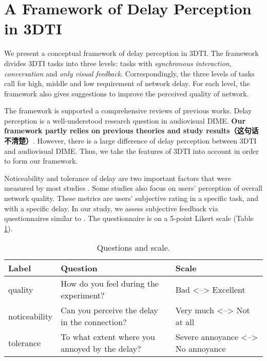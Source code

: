 \section{A Framework of Delay Perception in 3DTI}


We present a conceptual framework of delay perception in 3DTI. The framework divides 3DTI tasks into three levels: tasks with \emph{synchronous interaction}, \emph{conversation} and \emph{only visual feedback}. Correspondingly, the three levels of tasks call for high, middle and low requirement of network delay. For each level, the framework also gives suggestions to improve the perceived quality of network.

The framework is supported a comprehensive reviews of previous works. Delay perception is a well-understood research question in audiovisual DIME. \textbf{Our framework partly relies on previous theories and study results（这句话不清楚）}. However, there is a large difference of delay perception between 3DTI and audiovisual DIME. Thus, we take the features of 3DTI into account in order to form our framework.

Noticeability and tolerance of delay are two important factors that were measured by most studies \cite{wu2009quality, schmitt2014influence, geerts2011we, schmitt2014asymmetric}. Some studies also focus on users' perception of overall network quality. These metrics are users' subjective rating in a specific task, and with a specific delay. In our study, we assess subjective feedback via questionnaires similar to \cite{schmitt2014influence}. The questionnaire is on a 5-point Likert scale (Table \ref{tab:table_questionnaire}).

\begin{table} [!htbp]
\begin{tabular}{|p{}|p{}|p{}|}
\hline 
Label & Question & Scale \\
\hline
quality & How do you feel during the experiment? &Bad <--> Excellent \\
\hline
noticeability & Can you perceive the delay in the connection? & Very much <--> Not at all \\
\hline
tolerance & To what extent where you annoyed by the delay? & Severe annoyance <--> No annoyance \\
\hline
\end{tabular}
\caption{Questions and scale.}
\label{tab:table_questionnaire}
\end{table}

